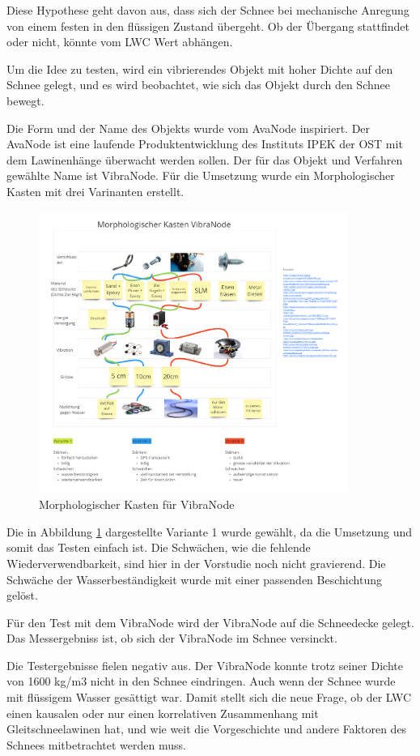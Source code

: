 
Diese Hypothese geht davon aus, dass sich der Schnee bei mechanische Anregung von einem festen in den flüssigen Zustand übergeht. Ob der Übergang stattfindet oder nicht, könnte vom LWC Wert abhängen.

Um die Idee zu testen, wird ein vibrierendes Objekt mit hoher Dichte auf den Schnee gelegt, und es wird beobachtet, wie sich das Objekt durch den Schnee bewegt.

Die Form und der Name des Objekts wurde vom AvaNode inspiriert. Der AvaNode ist eine laufende Produktentwicklung des Instituts IPEK der OST mit dem Lawinenhänge überwacht werden sollen. Der für das Objekt und Verfahren gewählte Name ist VibraNode. Für die Umsetzung wurde ein Morphologischer Kasten mit drei Varinanten erstellt.


\begin{figure}[H]
    \centering
    \includegraphics[width=0.9\textwidth]{Bilder/Unbenann2t.PNG}
    \caption{Morphologischer Kasten für VibraNode}
    \label{fig:Bildverarbeitnugskonzpet}
\end{figure}




Die in Abbildung \ref{fig:Bildverarbeitnugskonzpet} dargestellte Variante 1 wurde gewählt, da die Umsetzung und somit das Testen einfach ist. Die Schwächen, wie die fehlende Wiederverwendbarkeit, sind hier in der Vorstudie noch nicht gravierend. Die Schwäche der Wasserbeständigkeit wurde mit einer passenden Beschichtung gelöst.

Für den Test mit dem VibraNode wird der VibraNode auf die Schneedecke gelegt. Das Messergebniss ist, ob sich der VibraNode im Schnee versinckt.

Die Testergebnisse fielen negativ aus. Der VibraNode konnte trotz seiner Dichte von 1600 kg/m3 nicht in den Schnee eindringen. Auch wenn der Schnee wurde mit flüssigem Wasser gesättigt war. Damit  stellt sich die neue Frage, ob der LWC einen kausalen oder nur einen korrelativen Zusammenhang mit Gleitschneelawinen hat, und wie weit die Vorgeschichte und andere Faktoren des Schnees mitbetrachtet werden muss. \cite{Altman.2015}
